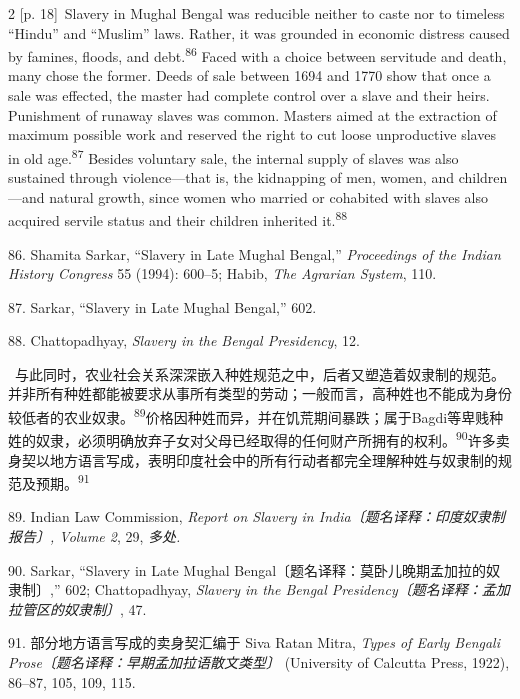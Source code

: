 \documentclass[10pt,a4paper]{article}
\begin{document}
\begin{paracol}{2}
\switchcolumn
{\scriptsize\color{gray} [p. 18]}\ Slavery in Mughal Bengal was reducible neither to caste nor to timeless “Hindu” and “Muslim” laws. Rather, it was grounded in economic distress caused by famines, floods, and debt.\nobreak\textsuperscript{86} Faced with a choice between servitude and death, many chose the former. Deeds of sale between 1694 and 1770 show that once a sale was effected, the master had complete control over a slave and their heirs. Punishment of runaway slaves was common. Masters aimed at the extraction of maximum possible work and reserved the right to cut loose unproductive slaves in old age.\nobreak\textsuperscript{87} Besides voluntary sale, the internal supply of slaves was also sustained through violence—that is, the kidnapping of men, women, and children—and natural growth, since women who married or cohabited with slaves also acquired servile status and their children inherited it.\nobreak\textsuperscript{88}\par{\small 86. Shamita Sarkar, “Slavery in Late Mughal Bengal,” \textit{Proceedings of the Indian History Congress} 55 (1994): 600–5; Habib, \textit{The Agrarian System}, 110.\par}{\small 87. Sarkar, “Slavery in Late Mughal Bengal,” 602.\par}{\small 88. Chattopadhyay, \textit{Slavery in the Bengal Presidency}, 12.\par}
\switchcolumn*
{\scriptsize\color{gray} [p. 18]}\ 与此同时，农业社会关系深深嵌入种姓规范之中，后者又塑造着奴隶制的规范。并非所有种姓都能被要求从事所有类型的劳动；一般而言，高种姓也不能成为身份较低者的农业奴\mbox{隶。\textsuperscript{89}}价格因种姓而异，并在饥荒期间暴跌；属于Bagdi等卑贱种姓的奴隶，必须明确放弃子女对父母已经取得的任何财产所拥有的权\mbox{利。\textsuperscript{90}}许多卖身契以地方语言写成，表明印度社会中的所有行动者都完全理解种姓与奴隶制的规范及预\mbox{期。\textsuperscript{91}}\par{\small 89. Indian Law Commission, \textit{Report on Slavery in India〔题名译释：印度奴隶制报告〕, Volume 2}, 29, \textit{多处.}\par}{\small 90. Sarkar, “Slavery in Late Mughal Bengal〔题名译释：莫卧儿晚期孟加拉的奴隶制〕,” 602; Chattopadhyay, \textit{Slavery in the Bengal Presidency〔题名译释：孟加拉管区的奴隶制〕}, 47.\par}{\small 91. 部分地方语言写成的卖身契汇编于 Siva Ratan Mitra, \textit{Types of Early Bengali Prose〔题名译释：早期孟加拉语散文类型〕} (University of Calcutta Press, 1922), 86–87, 105, 109, 115.\par}

\end{paracol}
\end{document}
